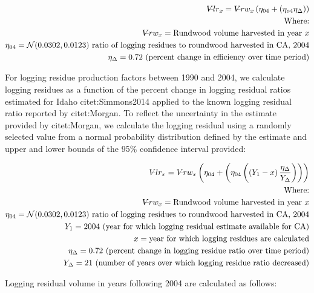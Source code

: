 \documentclass[a4paper]{article}
\begin{document}
\begin{align*}
V\llap{--}lr_{x} = V\llap{--}rw_{x}\left(\eta_{04}+\left(\eta_{o4}\eta_\Delta\right)\right)\\
\text{Where:}\\
V\llap{--}rw_{x} = \text{Rundwood volume harvested in year }x\\
\eta_{04} = \mathcal{N}(0.0302,0.0123) \text{ ratio of logging residues to roundwood harvested in CA, 2004}\\
\eta_\Delta = 0.72 \text{ (percent change in efficiency over time period)}\\
\end{align*}

For logging residue production factors between 1990 and 2004, we calculate logging residues as a function of the percent change in logging residual ratios estimated for Idaho citet:Simmons2014 applied to the known logging residual ratio reported by citet:Morgan. To reflect the uncertainty in the estimate provided by citet:Morgan, we calculate the logging residual using a randomly selected value from a normal probability distribution defined by the estimate and upper and lower bounds of the 95\% confidence interval provided:


\begin{align*}
V\llap{--}lr_{x} = V\llap{--}rw_{x}\left(\eta_{04}+ \left(\eta_{04}\left(\left(Y_1-x\right)\frac{\eta_\Delta}{Y_\Delta}\right)\right)\right)\\
\text{Where:}\\
V\llap{--}rw_{x} = \text{Rundwood volume harvested in year }x\\
\eta_{04} = \mathcal{N}(0.0302,0.0123) \text{ ratio of logging residues to roundwood harvested in CA, 2004}\\
Y_1 = 2004 \text{ (year for which logging residual estimate available for CA)} \\
x = \text{year for which logging residues are calculated}\\
\eta_\Delta = 0.72 \text{ (percent change in logging residue ratio over time period)}\\
Y_\Delta = 21\text{ (number of years over which logging residue ratio decreased)}
\end{align*}

Logging residual volume in years following 2004 are calculated as follows:
\end{document}
